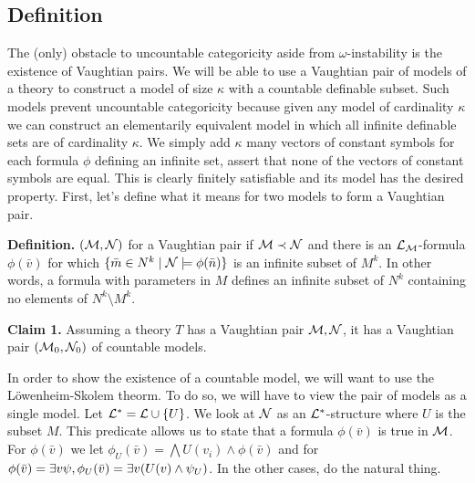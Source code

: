 \subsection{Definition}
The (only) obstacle to uncountable categoricity aside from \(\omega\)-instability is the existence of Vaughtian pairs.
We will be able to use a Vaughtian pair of models of a theory to construct a model of size \(\kappa\) with a countable definable subset.  
Such models prevent uncountable categoricity because given any model of cardinality \(\kappa\) we can construct an elementarily equivalent model in which all infinite definable sets are of cardinality \(\kappa\).
We simply add \(\kappa\) many vectors of constant symbols for each formula \(\phi\) defining an infinite set, assert that none of the vectors of constant symbols are equal. This is clearly finitely satisfiable and its model has the desired property.
First, let's define what it means for two models to form a Vaughtian pair. %

\textbf{Definition.} \((\mathcal{M}, \mathcal{N})\) for a Vaughtian pair if \(\mathcal{M} \prec \mathcal{N}\) and there is an \(\mathcal{L}_{\mathcal{M}}\)-formula \(\phi(\bar{v})\) for which
\(\{\bar{m} \in N^k \mid \mathcal{N} \models \phi(\bar{n})\}\) is an infinite subset of \(M^k\). 
In other words, a formula with parameters in \(M\) defines an infinite subset of \(N^k\) containing no elements of \(N^k \setminus M^k\).

\textbf{Claim 1.} Assuming a theory \(T\) has a Vaughtian pair \(\mathcal{M}, \mathcal{N}\), it has a Vaughtian pair \((\mathcal{M}_0, \mathcal{N}_0)\) of countable models. 

In order to show the existence of a countable model, we will want to use the L\"owenheim-Skolem theorm.
To do so, we will have to view the pair of models as a single model. 
Let  \(\mathcal{L}^* = \mathcal{L} \cup \{U\}\). 
We look at \(\mathcal{N}\) as an \(\mathcal{L}^*\)-structure where \(U\) is the subset \(M\). 
This predicate allows us to state that a formula \(\phi(\bar{v})\) is true in \(\mathcal{M}\).
For \(\phi(\bar{v})\) \qf we let \(\phi_U(\bar{v}) = \bigwedge U(v_i) \land \phi(\bar{v})\) and for \(\phi(\bar{v}) = \exists v \psi, \phi_U(\bar{v}) = \exists v (U(v) \land \psi_U)\). 
In the other cases, do the natural thing. 

